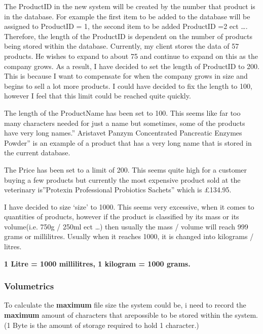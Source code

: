 \vspace{10mm} %


\begin{flushleft}
The ProductID in the new system will be created by the number that product is in the database. For example the first item to be added to the database will be assigned to ProductID = 1, the second item to be added ProductID =2 ect \ldots. Therefore, the length of the ProductID is dependent on the number of products being stored within the database. Currently, my client stores the data of 57 products. He wishes to expand to about 75 and continue to expand on this as the company grows. As a result, I have decided to set the length of ProductID to 200. This is because I want to compensate for when the company grows in size and begins to sell a lot more products. I could have decided to fix the length to 100, however I feel that this limit could be reached quite quickly.\par
The length of the ProductName has been set to 100. This seems like far too many characters needed for just a name but sometimes, some of the products have very long names.''
Aristavet Panzym Concentrated Pancreatic Enzymes Powder'' is an example of a product that has a very long name that is stored in the current database.\par
The Price has been set to a limit of 200. This seems quite high for a customer buying a few products but currently the most expensive product sold at the veterinary is''Protexin Professional Probiotics Sachets'' which is £134.95.\par
I have decided to size `size' to 1000. This seems very excessive, when it comes to quantities of products, however if the product is classified by its mass or its volume(i.e. 750g / 250ml ect \ldots) then usually the mass / volume will reach 999 grams or millilitres. Usually when it reaches 1000, it is changed into kilograms / litres.\par \textbf{1 Litre = 1000 millilitres, 1 kilogram = 1000 grams.}

\subsubsection{Volumetrics}

To calculate the \textbf{maximum} file size the system could be, i need to record the \textbf{maximum} amount of characters that arepossible to be stored within the system. (1 Byte is the amount of storage required to hold 1 character.) \par


\end{flushleft}

